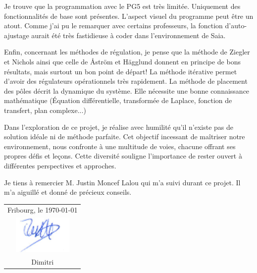 Je trouve que la programmation avec le PG5 est très limitée. Uniquement des fonctionnalités de base sont présentes. L'aspect visuel du programme peut être un atout. Comme j'ai pu le remarquer avec certains professeurs, la fonction d'auto-ajustage aurait été très fastidieuse à coder dans l'environnement de Saia. 

Enfin, concernant les méthodes de régulation, je pense que la méthode de Ziegler et Nichols ainsi que celle de Åström et Hägglund donnent en principe de bons résultats, mais surtout un bon point de départ! La méthode itérative permet d'avoir des régulateurs opérationnels très rapidement. La méthode de placement des pôles décrit la dynamique du système. Elle nécessite une bonne connaissance mathématique (\'Equation différentielle, transformée de Laplace, fonction de transfert, plan complexe...)


Dans l'exploration de ce projet, je réalise avec humilité qu'il n'existe pas de solution idéale ni de méthode parfaite. Cet objectif incessant de maîtriser notre environnement, nous confronte à une multitude de voies, chacune offrant ses propres défis et leçons. Cette diversité souligne l'importance de rester ouvert à différentes perspectives et approches.

Je tiens à remercier M. Justin Moncef Lalou qui m’a suivi durant ce projet. Il m’a aiguillé et donné de précieux conseils.


\vspace{\fill}
\begin{flushright}
	\begin{tabular}{c}
		Fribourg, le \today\\
		\includegraphics[height=5em]{img/Signature.png} \\
		\@Maillard Dimitri
	\end{tabular}
\end{flushright}
